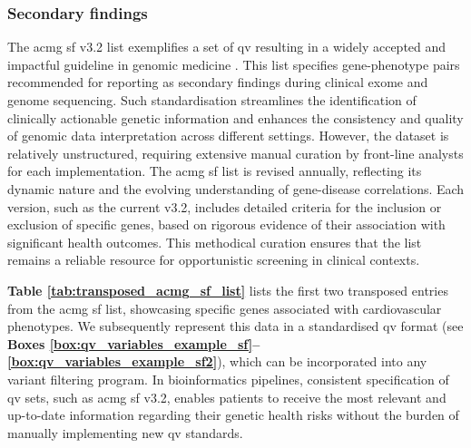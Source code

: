 \subsubsection{Secondary findings}
\label{sec:sf}
The \ac{acmg} \ac{sf} v3.2 list exemplifies a set  of \ac{qv} resulting in a widely accepted and impactful  guideline in genomic medicine \cite{miller2023acmg}. This list specifies gene-phenotype pairs recommended for reporting as secondary findings during clinical exome and genome sequencing. Such standardisation streamlines the identification of clinically actionable genetic information and enhances the consistency and quality of genomic data interpretation across different settings. However, the dataset is relatively unstructured, requiring extensive manual curation by front-line analysts for each implementation. The \ac{acmg} \ac{sf} list is revised annually, reflecting its dynamic nature and the evolving understanding of gene-disease correlations. Each version, such as the current v3.2, includes detailed criteria for the inclusion or exclusion of specific genes, based on rigorous evidence of their association with significant health outcomes. This methodical curation ensures that the list remains a reliable resource for opportunistic screening in clinical contexts.


\textbf{Table \ref{tab:transposed_acmg_sf_list}} lists the first two transposed entries from the \ac{acmg} \ac{sf} list, showcasing specific genes associated with cardiovascular phenotypes. We subsequently represent this data in a standardised \ac{qv} format (see \textbf{Boxes \ref{box:qv_variables_example_sf}–\ref{box:qv_variables_example_sf2}}), which can be incorporated into any variant filtering program. In bioinformatics pipelines, consistent specification of \ac{qv} sets, such as \ac{acmg} \ac{sf} v3.2, enables patients to receive the most relevant and up-to-date information regarding their genetic health risks without the burden of manually implementing new \ac{qv} standards.

